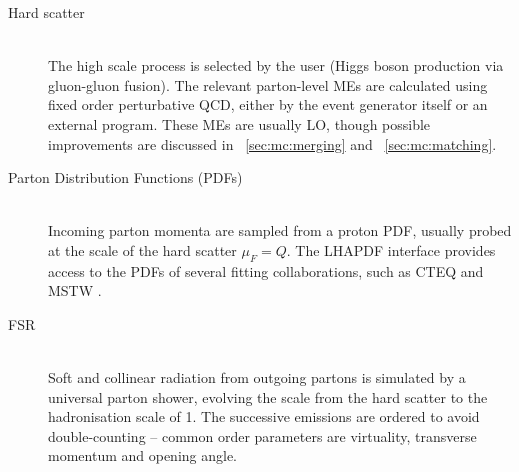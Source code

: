 \begin{description}
\item[Hard scatter] \hfill \\
	The high scale process is selected by the user (\eg Higgs boson production via 
	gluon-gluon fusion). The relevant parton-level \acp{ME} are calculated using fixed 
	order perturbative QCD, either by the event generator itself or an external program. 
	These \acp{ME} are usually \ac{LO}, though possible improvements are discussed in 
	\Section~\ref{sec:mc:merging} and \Section~\ref{sec:mc:matching}.
\item[Parton Distribution Functions (PDFs)] \hfill \\
	Incoming parton momenta are sampled from a proton \ac{PDF}, usually probed at the 
	scale of the hard scatter $\mu_F = Q$. The LHAPDF interface \cite{LHAPDF} provides 
	access to the \acp{PDF} of several fitting collaborations, such as CTEQ \cite{CTEQ} 
	and MSTW \cite{MSTW}.
\item[\ac{FSR}] \hfill \\
	Soft and collinear radiation from outgoing partons is simulated by a universal parton 
	shower, evolving the scale from the hard scatter to the hadronisation scale of 
	\about\unit{1}{\GeV}. The successive emissions are ordered to avoid double-counting --
	common order parameters are virtuality, transverse momentum and opening angle.


\end{description}
